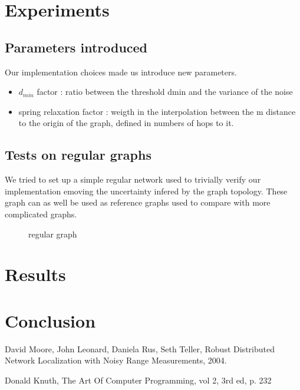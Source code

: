 \documentclass[letterpaper, 10 pt, conference]{ieeeconf}  %
\begin{document}
\section{Experiments}

\subsection{Parameters introduced}

Our implementation choices made us introduce new parameters. 

\begin{itemize}
\item $d_{min}$ factor : ratio between the threshold dmin and the variance of the noise
\item spring relaxation factor : weigth in the interpolation between the m distance to the origin of the graph, defined in numbers of hops to it.
\end{itemize}


\subsection{Tests on regular graphs}

We tried to set up a simple regular network used to trivially verify our implementation emoving the uncertainty infered by the graph topology. These graph can as well be used as reference graphs used to compare with more complicated graphs.\newline


\begin{figure}[ht!]
\centering
\caption{regular graph}
\end{figure}


\section{Results}

\section{Conclusion}


\begin{thebibliography}{99}

 David Moore, John Leonard, Daniela Rus, Seth Teller, Robust Distributed Network Localization with Noisy Range Measurements, 2004.

 Donald Knuth, The Art Of Computer Programming, vol 2, 3rd ed, p. 232





\end{thebibliography}
\end{document}

